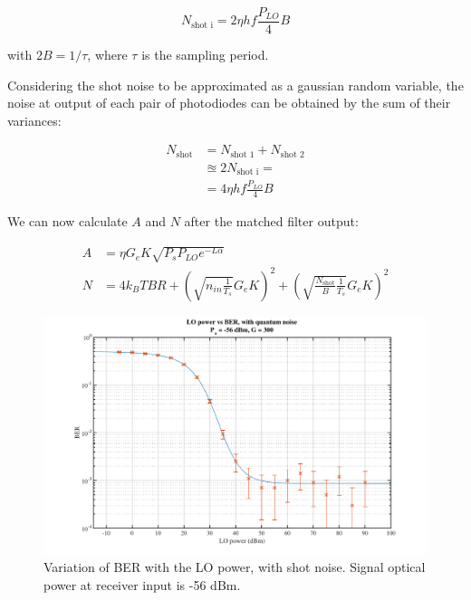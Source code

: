 \begin{equation}
	N_{\text{shot i}} = 2 \eta h f \frac{P_{LO}}{4} B
\end{equation}

\noindent with $2 B = 1/\tau$, where $\tau$ is the sampling period.

Considering the shot noise to be approximated as a gaussian random 
variable, the noise at output of each pair of photodiodes can be obtained by 
the sum of their variances:

\begin{equation}
	\begin{split}
		N_{\text{shot}} &= N_{\text{shot 1}} + N_{\text{shot 2}} \\
										&\approxeq 2 N_{\text{shot i}} =\\
										&= 4 \eta h f \frac{P_{LO}}{4} B
	\end{split}
\end{equation}

We can now calculate $A$ and $N$ after the matched filter output:

\begin{equation}
	\begin{split}
		A &= \eta G_e K \sqrt{ P_s P_{LO} e^{-L\alpha}}\\
		N &= {4 k_B T B R} + \left(\sqrt{n_{in} \frac{1}{T_s}} G_e K\right)^2 +
		 \left(\sqrt{\frac{N_{\text{shot}}}{B} \frac{1}{T_s}} G_e K\right)^2
	\end{split}
\end{equation}

	\begin{figure}[h]
	\centering
	\includegraphics[width=1\textwidth]
	{sdf/m_qam_system/figures/simulations/05_loShot/berCurve_loShotVar.pdf}
	\caption{Variation of BER with the LO power, with shot noise. Signal optical 
	power at receiver 
		input is -56 dBm.}\label{fig:sim_loShot_varLO}
\end{figure}

